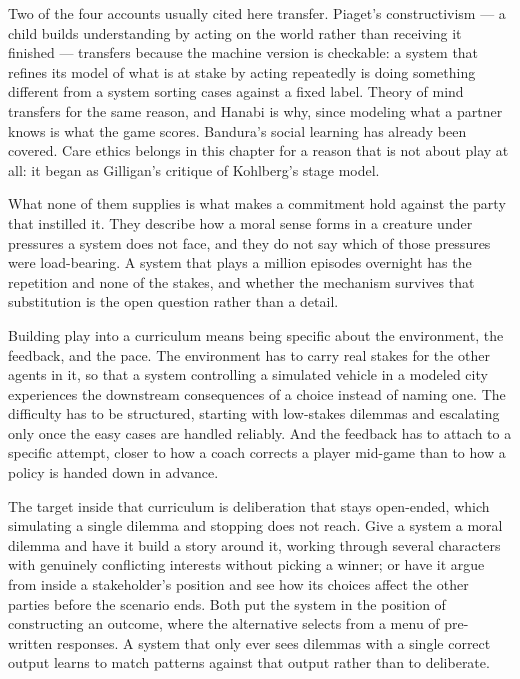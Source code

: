 Two of the four accounts usually cited here transfer. Piaget's constructivism — a child builds understanding by acting on the world rather than receiving it finished \autocite{piaget1962play} — transfers because the machine version is checkable: a system that refines its model of what is at stake by acting repeatedly is doing something different from a system sorting cases against a fixed label. Theory of mind transfers for the same reason, and Hanabi is why, since modeling what a partner knows is what the game scores. Bandura's social learning has already been covered. Care ethics belongs in this chapter for a reason that is not about play at all: it began as Gilligan's critique of Kohlberg's stage model.

What none of them supplies is what makes a commitment hold against the party that instilled it. They describe how a moral sense forms in a creature under pressures a system does not face, and they do not say which of those pressures were load-bearing. A system that plays a million episodes overnight has the repetition and none of the stakes, and whether the mechanism survives that substitution is the open question rather than a detail.

Building play into a curriculum means being specific about the environment, the feedback, and the pace. The environment has to carry real stakes for the other agents in it, so that a system controlling a simulated vehicle in a modeled city experiences the downstream consequences of a choice instead of naming one. The difficulty has to be structured, starting with low-stakes dilemmas and escalating only once the easy cases are handled reliably. And the feedback has to attach to a specific attempt, closer to how a coach corrects a player mid-game than to how a policy is handed down in advance.

The target inside that curriculum is deliberation that stays open-ended, which simulating a single dilemma and stopping does not reach. Give a system a moral dilemma and have it build a story around it, working through several characters with genuinely conflicting interests without picking a winner; or have it argue from inside a stakeholder's position and see how its choices affect the other parties before the scenario ends. Both put the system in the position of constructing an outcome, where the alternative selects from a menu of pre-written responses. A system that only ever sees dilemmas with a single correct output learns to match patterns against that output rather than to deliberate.

